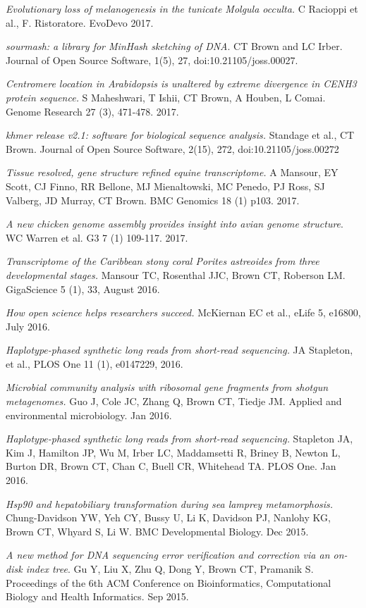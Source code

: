 \documentclass[margin,line]{resume}
\begin{document}
\begin{resume}
{\em Evolutionary loss of melanogenesis in the tunicate Molgula occulta.} C Racioppi et al., F. Ristoratore. EvoDevo 2017.

{\em sourmash: a library for MinHash sketching of DNA}. CT Brown and LC Irber. Journal of Open Source Software, 1(5), 27, doi:10.21105/joss.00027.

{\em Centromere location in Arabidopsis is unaltered by extreme divergence in CENH3 protein sequence.} S Maheshwari, T Ishii, CT Brown, A Houben, L Comai. Genome Research 27 (3), 471-478. 2017.

{\em khmer release v2.1: software for biological sequence analysis.} Standage et al., CT Brown. Journal of Open Source Software, 2(15), 272, doi:10.21105/joss.00272

{\em Tissue resolved, gene structure refined equine transcriptome.} A Mansour, EY Scott, CJ Finno, RR Bellone, MJ Mienaltowski, MC Penedo, PJ Ross, SJ Valberg, JD Murray, CT Brown. BMC Genomics 18 (1) p103. 2017.

{\em A new chicken genome assembly provides insight into avian genome structure}. WC Warren et al. G3 7 (1) 109-117. 2017.

{\em Transcriptome of the Caribbean stony coral Porites astreoides from three developmental stages.} Mansour TC, Rosenthal JJC, Brown CT, Roberson LM.
GigaScience 5 (1), 33, August 2016.

{\em How open science helps researchers succeed.}
McKiernan EC et al., eLife 5, e16800, July 2016.

{\em Haplotype-phased synthetic long reads from short-read sequencing.}
JA Stapleton, et al.,
PLOS One 11 (1), e0147229, 2016.

{\em Microbial community analysis with ribosomal gene fragments from shotgun metagenomes.} Guo J, Cole JC, Zhang Q, Brown CT, Tiedje JM. Applied and environmental microbiology. Jan 2016.

{\em Haplotype-phased synthetic long reads from short-read sequencing.} Stapleton JA, Kim J, Hamilton JP, Wu M, Irber LC, Maddamsetti R, Briney B, Newton L, Burton DR, Brown CT, Chan C, Buell CR, Whitehead TA. PLOS One. Jan 2016.

{\em Hsp90 and hepatobiliary transformation during sea lamprey metamorphosis.}
Chung-Davidson YW, Yeh CY, Bussy U, Li K, Davidson PJ, Nanlohy KG, Brown CT, Whyard S, Li W. BMC Developmental Biology. Dec 2015.

{\em A new method for DNA sequencing error verification and correction via an on-disk index tree}. Gu Y, Liu X, Zhu Q, Dong Y, Brown CT, Pramanik S.  Proceedings of the 6th ACM Conference on Bioinformatics, Computational Biology and Health Informatics. Sep 2015.


\end{resume}
\end{document}
